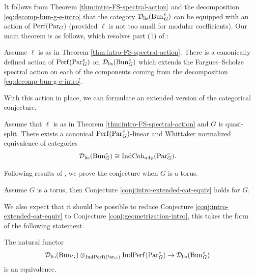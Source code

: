 It follows from Theorem \ref{thm:intro-FS-spectral-action} and the decomposition \eqref{eq:decomp-bun-g-e-intro} that the category $\mathcal{D}_{\mathrm{lis}}(\mathrm{Bun}_G^e)$ can be equipped with an action of $\mathrm{Perf}(\mathrm{Par}_G)$ (provided $\ell$ is not too small for modular coefficients). Our main theorem is as follows, which resolves part (1) of \cite[Conjecture 12.8]{Fargues22}: 
\begin{thm}\label{thm:intro-extended-spectral-action}
    Assume $\ell$ is as in Theorem \ref{thm:intro-FS-spectral-action}. There is a canonically defined action of $\mathrm{Perf}(\mathrm{Par}_G^e)$ on $\mathcal{D}_{\mathrm{lis}}(\mathrm{Bun}_G^e)$ which extends the Fargues--Scholze spectral action on each of the components coming from the decomposition \eqref{eq:decomp-bun-g-e-intro}.
\end{thm}

With this action in place, we can formulate an extended version of the categorical conjecture.
\begin{conj}\label{conj:intro-extended-cat-equiv}
    Assume that $\ell$ is as in Theorem \ref{thm:intro-FS-spectral-action} and $G$ is quasi-split. 
    There exists a canonical $\mathrm{Perf}(\mathrm{Par}_G^e)$-linear and Whittaker normalized equivalence of categories
    $$\mathcal{D}_{\mathrm{lis}}(\mathrm{Bun}_G^e) \cong \mathrm{IndCoh}_{\mathrm{nilp}}(\mathrm{Par}_G^e).$$
\end{conj}

Following results of \cite{Zou24}, we prove the conjecture when $G$ is a torus. 
\begin{thm}
    Assume $G$ is a torus, then Conjecture \ref{conj:intro-extended-cat-equiv} holds for $G$.
\end{thm}

We also expect that it should be possible to reduce Conjecture \ref{conj:intro-extended-cat-equiv} to Conjecture \ref{conj:geometrization-intro}, this takes the form of the following statement. 
\begin{conj}\label{conj:intro-reduction-to-classical}
    The natural functor 
    \begin{equation}\label{eq:reduction-to-classical-intro}
        \mathcal{D}_{\mathrm{lis}}(\mathrm{Bun}_G) \otimes_{\mathrm{Ind}\mathrm{Perf}(\mathrm{Par}_G)} \mathrm{Ind}\mathrm{Perf}(\mathrm{Par}_G^e) \to \mathcal{D}_{\mathrm{lis}}(\mathrm{Bun}_G^e)
    \end{equation}
    is an equivalence. 
\end{conj}

